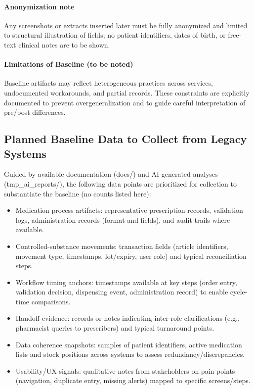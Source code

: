 \paragraph{Anonymization note}
Any screenshots or extracts inserted later must be fully anonymized and limited to structural illustration of fields; no patient identifiers, dates of birth, or free-text clinical notes are to be shown.

\paragraph{Limitations of Baseline (to be noted)}
Baseline artifacts may reflect heterogeneous practices across services, undocumented workarounds, and partial records. These constraints are explicitly documented to prevent overgeneralization and to guide careful interpretation of pre/post differences.

\subsection{Planned Baseline Data to Collect from Legacy Systems}
Guided by available documentation (docs/) and AI-generated analyses (tmp\_ai\_reports/), the following data points are prioritized for collection to substantiate the baseline (no counts listed here):
\begin{itemize}
    \item Medication process artifacts: representative prescription records, validation logs, administration records (format and fields), and audit trails where available.
    \item Controlled-substance movements: transaction fields (article identifiers, movement type, timestamps, lot/expiry, user role) and typical reconciliation steps.
    \item Workflow timing anchors: timestamps available at key steps (order entry, validation decision, dispensing event, administration record) to enable cycle-time comparisons.
    \item Handoff evidence: records or notes indicating inter-role clarifications (e.g., pharmacist queries to prescribers) and typical turnaround points.
    \item Data coherence snapshots: samples of patient identifiers, active medication lists and stock positions across systems to assess redundancy/discrepancies.
    \item Usability/UX signals: qualitative notes from stakeholders on pain points (navigation, duplicate entry, missing alerts) mapped to specific screens/steps.
\end{itemize}

